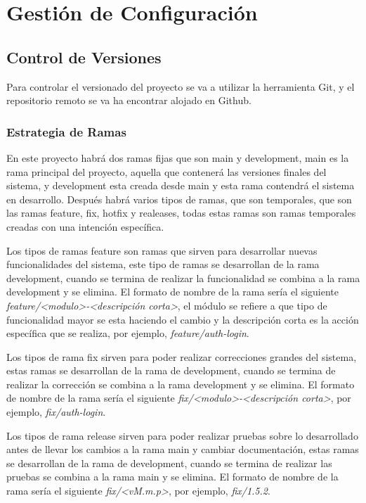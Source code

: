 \section{Gestión de Configuración}

\subsection{Control de Versiones}

Para controlar el versionado del proyecto se va a utilizar la herramienta Git, y el repositorio remoto se va ha encontrar alojado en Github.

\subsubsection{Estrategia de Ramas}

En este proyecto habrá dos ramas fijas que son main y development, main es la rama principal del proyecto, aquella que contenerá las versiones finales del sistema, y development esta creada desde main y esta rama contendrá el sistema en desarrollo. Después habrá varios tipos de ramas, que son temporales, que son las ramas feature, fix, hotfix y realeases, todas estas ramas son ramas temporales creadas con una intención específica.

Los tipos de ramas feature son ramas que sirven para desarrollar nuevas funcionalidades del sistema, este tipo de ramas se desarrollan de la rama development, cuando se termina de realizar la funcionalidad se combina a la rama development y se elimina. El formato de nombre de la rama sería el siguiente \textit{feature/<modulo>-<descripción corta>}, el módulo se refiere a que tipo de funcionalidad mayor se esta haciendo el cambio y la descripción corta es la acción específica que se realiza, por ejemplo, \textit{feature/auth-login}.

Los tipos de rama fix sirven para poder realizar correcciones grandes del sistema, estas ramas se desarrollan de la rama de development, cuando se termina de realizar la corrección se combina a la rama development y se elimina. El formato de nombre de la rama sería el siguiente \textit{fix/<modulo>-<descripción corta>}, por ejemplo, \textit{fix/auth-login}.

Los tipos de rama release sirven para poder realizar pruebas sobre lo desarrollado antes de llevar los cambios a la rama main y cambiar documentación, estas ramas se desarrollan de la rama de development, cuando se termina de realizar las pruebas se combina a la rama main y se elimina. El formato de nombre de la rama sería el siguiente \textit{fix/<vM.m.p>}, por ejemplo, \textit{fix/1.5.2}.

